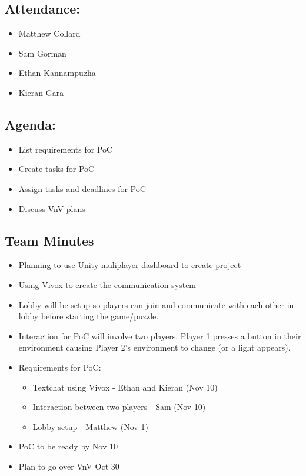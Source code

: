 \documentclass{article}
\begin{document}
\subsection*{Attendance:}
\begin{itemize}
    \item Matthew Collard
    \item Sam Gorman
    \item Ethan Kannampuzha
    \item Kieran Gara
\end{itemize}

\subsection*{Agenda:}
\begin{itemize}
    \item List requirements for PoC
    \item Create tasks for PoC
    \item Assign tasks and deadlines for PoC
    \item Discuss VnV plans
\end{itemize}

\subsection*{Team Minutes}

\begin{itemize}
    \item Planning to use Unity muliplayer dashboard to create project
    \item Using Vivox to create the communication system
    \item Lobby will be setup so players can join and communicate with each other in lobby before starting the game/puzzle.
    \item Interaction for PoC will involve two players. Player 1 presses a button in their environment causing Player 2's environment to change (or a light appears).
    \item Requirements for PoC:
        \begin{itemize}
            \item Textchat using Vivox - Ethan and Kieran (Nov 10)
            \item Interaction between two players - Sam (Nov 10)
            \item Lobby setup - Matthew (Nov 1)
        \end{itemize}
    \item PoC to be ready by Nov 10
    \item Plan to go over VnV Oct 30
\end{itemize}
\end{document}
